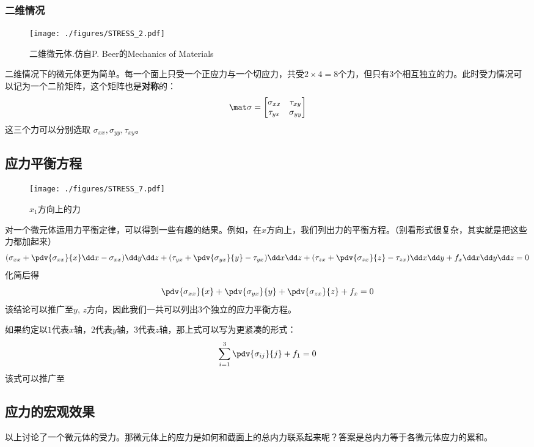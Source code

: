 \subsubsection{二维情况}
\begin{figure}[ht]
\centering
\texttt{[image: ./figures/STRESS\_2.pdf]}
\caption{二维微元体.仿自P. Beer的Mechanics of Materials} \label{STRESS_fig2}
\end{figure}

二维情况下的微元体更为简单。每一个面上只受一个正应力与一个切应力，共受$2\times4=8$个力，但只有3个相互独立的力。此时受力情况可以记为一个二阶矩阵，这个矩阵也是\textbf{对称}的：
\begin{equation}
\mat \sigma=
\begin{bmatrix}
\sigma_{xx} & \tau_{xy}\\
\tau_{yx} & \sigma_{yy}\\
\end{bmatrix}
\end{equation}
这三个力可以分别选取 $\sigma_{xx}, \sigma_{yy}, \tau_{xy}$。

\subsection{应力平衡方程}
\begin{figure}[ht]
\centering
\texttt{[image: ./figures/STRESS\_7.pdf]}
\caption{$x_1$方向上的力} \label{STRESS_fig7}
\end{figure}
对一个微元体运用力平衡定律，可以得到一些有趣的结果。例如，在$x$方向上，我们列出力的平衡方程。（别看形式很复杂，其实就是把这些力都加起来）
$$
(\sigma_{xx} + \pdv{\sigma_{xx}}{x} \dd x - \sigma_{xx})\dd y \dd z
+ (\tau_{yx} + \pdv{\sigma_{yx}}{y} - \tau_{yx}) \dd x \dd z
+ (\tau_{zx} + \pdv{\sigma_{zx}}{z} - \tau_{zx}) \dd x \dd y 
+ f_x \dd x \dd y \dd z= 0$$
化简后得
$$
\pdv{\sigma_{xx}}{x} + \pdv{\sigma_{yx}}{y} + \pdv{\sigma_{zx}}{z} + f_x = 0
$$
该结论可以推广至$y$, $z$方向，因此我们一共可以列出$3$个独立的应力平衡方程。

如果约定以$1$代表$x$轴，$2$代表$y$轴，$3$代表$z$轴，那上式可以写为更紧凑的形式：
$$
\sum_{i=1}^3 \pdv{\sigma_{ij}}{j} + f_1=0
$$
该式可以推广至

\subsection{应力的宏观效果}
以上讨论了一个微元体的受力。那微元体上的应力是如何和截面上的总内力联系起来呢？答案是总内力等于各微元体应力的累和。

